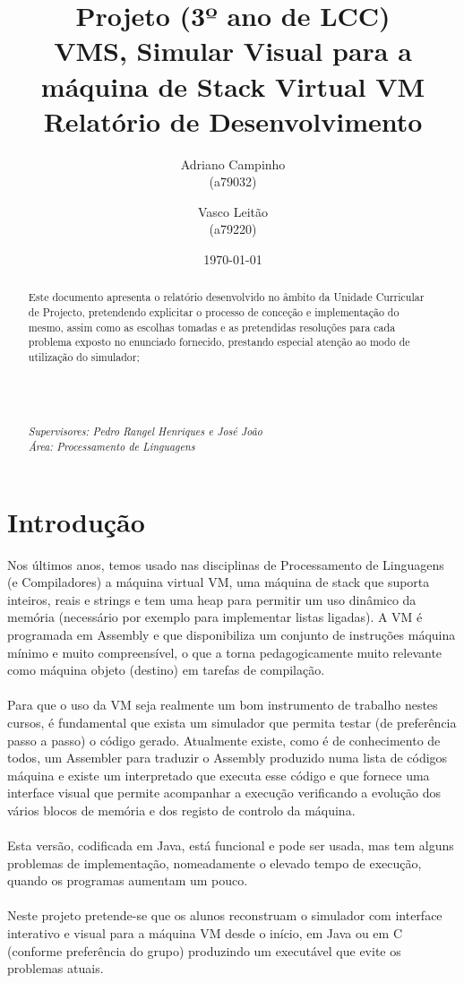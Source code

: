 \documentclass{report}
\title{Projeto (3º ano de LCC)\\ \textbf{VMS, Simular Visual para a máquina de Stack Virtual VM}\\ Relatório de Desenvolvimento}
\author{Adriano Campinho\\ (a79032) \and Vasco Leitão\\ (a79220) }
\date{\today}
\def\supers#1{{\em Supervisores: #1}\\ }
\def\area#1{{\em \'{A}rea: #1}\\[0.2cm]}
\begin{document}
\maketitle
\begin{abstract}
	\quad Este documento apresenta o relatório desenvolvido no âmbito da Unidade Curricular de Projecto, pretendendo
	explicitar o processo de conceção e implementação do mesmo, assim como as escolhas tomadas e as pretendidas resoluções
	para cada problema exposto no enunciado fornecido, prestando especial atenção ao modo de utilização do simulador; \\
	\\
	\\
	\\
  \\
	\supers{Pedro Rangel Henriques e José João}
	\area{Processamento de Linguagens}

\end{abstract}

\tableofcontents

\chapter{Introdução} \label{intro}

\quad Nos últimos anos, temos usado nas disciplinas de Processamento de Linguagens (e
Compiladores) a máquina virtual VM, uma máquina de stack que suporta inteiros, reais e
strings e tem uma heap para permitir um uso dinâmico da memória (necessário por exemplo
para implementar listas ligadas). A VM é programada em Assembly e que disponibiliza um
conjunto de instruções máquina mínimo e muito compreensível, o que a torna
pedagogicamente muito relevante como máquina objeto (destino) em tarefas de compilação.
\\
\\
\null\quad Para que o uso da VM seja realmente um bom instrumento de trabalho nestes cursos, é
fundamental que exista um simulador que permita testar (de preferência passo a passo) o
código gerado. Atualmente existe, como é de conhecimento de todos, um Assembler para
traduzir o Assembly produzido numa lista de códigos máquina e existe um interpretado que
executa esse código e que fornece uma interface visual que permite acompanhar a execução
verificando a evolução dos vários blocos de memória e dos registo de controlo da máquina.
\\
\\
\null\quad Esta versão, codificada em Java, está funcional e pode ser usada, mas tem alguns problemas de
implementação, nomeadamente o elevado tempo de execução, quando os programas
aumentam um pouco.
\\
\\
\null\quad Neste projeto pretende-se que os alunos reconstruam o simulador com interface interativo e
visual para a máquina VM desde o início, em Java ou em C (conforme preferência do grupo)
produzindo um executável que evite os problemas atuais.
\end{document}

